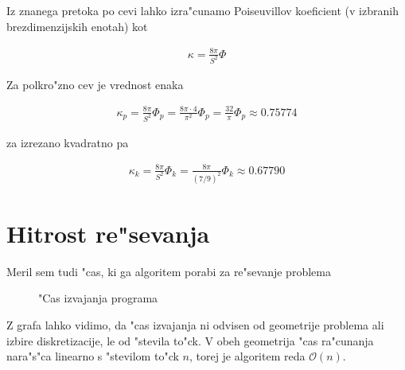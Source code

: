 \documentclass[a4paper,10pt]{article}
\begin{document}
Iz znanega pretoka po cevi lahko izra"cunamo Poiseuvillov koeficient (v izbranih brezdimenzijskih enotah) kot

\begin{align}
 \kappa = \frac{8\pi}{S^2} \Phi
\end{align}

Za polkro"zno cev je vrednost enaka

\begin{align}
 \kappa_p = \frac{8\pi}{S^2} \Phi_p = \frac{8\pi \cdot 4}{\pi^2} \Phi_p = \frac{32}{\pi}\Phi_p \approx 0.75774
\end{align}

za izrezano kvadratno pa

\begin{align}
 \kappa_k = \frac{8\pi}{S^2} \Phi_k = \frac{8\pi}{(7/9)^2} \Phi_k \approx 0.67790
\end{align}

\section{Hitrost re"sevanja}

Meril sem tudi "cas, ki ga algoritem porabi za re"sevanje problema

\begin{figure}[H]
 
 \caption{"Cas izvajanja programa}
 \label{fig:hitrost}
\end{figure}

Z grafa lahko vidimo, da "cas izvajanja ni odvisen od geometrije problema ali izbire diskretizacije, le od "stevila to"ck. V obeh geometrija "cas ra"cunanja nara"s"ca linearno s "stevilom to"ck $n$, torej je algoritem reda $\mathcal{O}(n)$.
\end{document}
